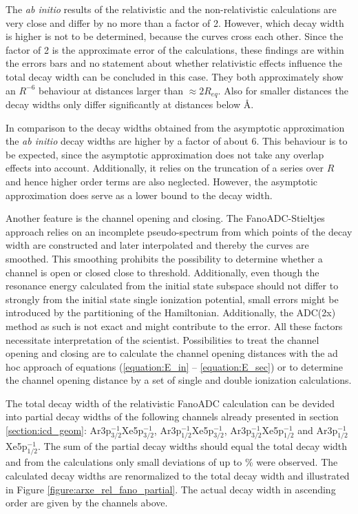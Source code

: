 The \textit{ab initio} results of the relativistic and the non-relativistic
calculations are very close and differ by no more than a factor of 2.
However, which decay width is higher is not to be determined, because the
curves cross each other.
Since the factor of 2 is the approximate error of the calculations,
these findings are within the errors bars and no statement
about whether relativistic effects influence the total decay width can be
concluded in this case.
They both approximately show an $R^{-6}$ behaviour at distances larger than
$\approx 2R_{eq}$. Also for smaller distances the decay widths only differ
significantly at distances below \unit[5]{\AA}.

In comparison to the decay widths obtained from the asymptotic approximation the
\textit{ab initio} decay widths are higher by a factor of about 6. This behaviour
is to be expected, since the asymptotic approximation does not take any overlap
effects into account. Additionally, it relies on the truncation of a series over
$R$ and hence higher order terms are also neglected. However, the asymptotic
approximation does serve as a lower bound to the decay width.

Another feature is the channel opening and closing. The FanoADC-Stieltjes
approach relies on an incomplete pseudo-spectrum from which points of the
decay width are constructed and later interpolated and thereby the curves are
smoothed. This smoothing prohibits the possibility to determine whether a channel
is open or closed close to threshold. Additionally, even though the resonance energy
calculated from the initial state subspace should not differ to strongly from the
initial state single ionization potential, small errors might be introduced by
the partitioning of the Hamiltonian. Additionally, the \ac{ADC}(2x) method as such
is not exact and might contribute to the error. All these factors necessitate
interpretation of the scientist.
Possibilities to treat the channel opening and closing are to calculate the
channel opening distances with the ad hoc approach of equations (\ref{equation:E_in}
-- \ref{equation:E_sec}) or to determine the channel opening distance by a set of
single and double ionization calculations.


The total decay width of the relativistic FanoADC calculation can be devided
into partial decay widths of the following channels already presented in
section \ref{section:icd_geom}: Ar3p$_{3/2}^{-1}$Xe5p$_{3/2}^{-1}$,
Ar3p$_{1/2}^{-1}$Xe5p$_{3/2}^{-1}$, Ar3p$_{3/2}^{-1}$Xe5p$_{1/2}^{-1}$ and
Ar3p$_{1/2}^{-1}$Xe5p$_{1/2}^{-1}$. The sum of the partial decay widths should
equal the total decay width and from the calculations only small deviations
of up to \unit[10]{\%} were observed. The calculated decay widths are renormalized
to the total decay width and illustrated in
Figure \ref{figure:arxe_rel_fano_partial}. The actual decay width in ascending
order are given by the channels above.

